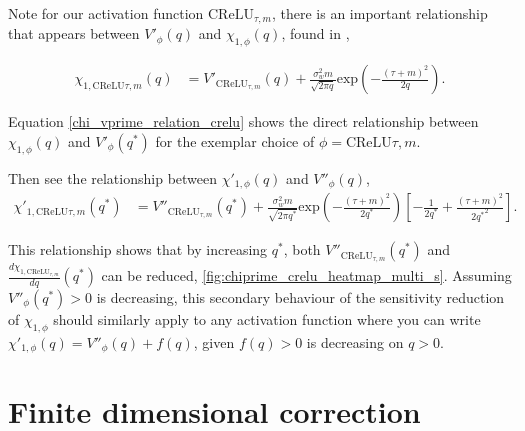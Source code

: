 \documentclass{article}
\theoremstyle{plain}
\theoremstyle{definition}
\theoremstyle{remark}
\begin{document}
Note for our activation function $\text{CReLU}_{\tau, m}$, there is an important relationship that appears between $V'_{\phi}(q)$ and $\chi_{1, \phi}(q)$, found in \cite{price_deep_2023},

\begin{align}
    \chi_{1, \text{CReLU}{\tau, m}}(q) &= V'_{\text{CReLU}_{\tau, m}}(q) + \frac{\sigma_w^2m}{\sqrt{2 \pi q}} \text{exp}\left( -\frac{ (\tau +m)^2}{{2q}} \right). \label{chi_vprime_relation_crelu}
\end{align}

Equation \eqref{chi_vprime_relation_crelu} shows the direct relationship between $\chi_{1, \phi}(q)$ and $V'_{\phi}(q^*)$ for the exemplar choice of $\phi = \text{CReLU}{\tau, m}$. 

Then see the relationship between $\chi'_{1, \phi}(q)$ and $V''_{\phi}(q)$,
\begin{align}
     \chi'_{1, \text{CReLU}{\tau, m}}(q^*) &= V''_{\text{CReLU}_{\tau, m}}(q^*) + \frac{\sigma_w^2m}{\sqrt{2 \pi q^*}}\text{exp}\left( -\frac{ (\tau +m)^2}{{2q^*}} \right) \left[-\frac{1}{2q^*}+ \frac{ (\tau +m)^2}{{2{q^*}^2}}\right].
\end{align}

This relationship shows that  by increasing $q^*$, both $V''_{\text{CReLU}_{\tau, m}}(q^*)$ and $\frac{d\chi_{1, \text{CReLU}_{\tau, m}}}{dq} \left( q^* \right)$ can be reduced, \cref{fig:chiprime_crelu_heatmap_multi_s}. Assuming $V''_{\phi}(q^*)>0$ is decreasing, this secondary behaviour of the sensitivity reduction of $\chi_{1, \phi}$ should similarly apply to any activation function where you can write $ \chi'_{1, \phi}(q) = V''_{\phi}(q) + f(q)$, given $f (q)>0$ is decreasing on $q>0$.

\pagebreak
\section{Finite dimensional correction}\label{appendix_finite_correction}
\end{document}
